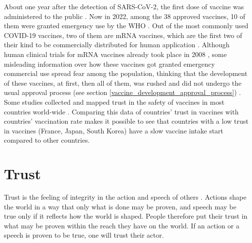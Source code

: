 About one year after the detection of SARS-CoV-2, the first dose of vaccine was administered to the public \cite{nhs_first_vaccination}. Now in 2022, among the 38 approved vaccines, 10 of them were granted emergency use by the WHO \cite{who_covid-19_vaccines_approved_2022, who_covid-19_vaccines_2022}. Out of the most commonly used COVID-19 vaccines, two of them are mRNA vaccines, which are the first two of their kind to be commercially distributed for human application \cite{uk-dhsc_pfizer_vaccine_2020, dolgin_tangled_2021}. Although human clinical trials for mRNA vaccines already took place in 2008 \cite{weide_results_2008, sahin_mrna-based_2014}, some misleading information over how these vaccines got granted emergency commercial use spread fear among the population, thinking that the development of these vaccines, at first, then all of them, was rushed and did not undergo the usual approval process (see section \ref{vaccine_development_approval_process}) \cite{uuhc_covid-19_vaccines_2022, care_is_2021}.
Some studies collected and mapped trust in the safety of vaccines in most countries world-wide \cite{figueiredo_mapping_2020, sallam_global_2022}. Comparing this data of countries' trust in vaccines with countries' vaccination rate \cite{mathieu_global_2021, ritchie_coronavirus_2020} makes it possible to see that countries with a low trust in vaccines (France, Japan, South Korea) have a slow vaccine intake start compared to other countries.



\section{Trust}
\label{trust}

Trust is the feeling of integrity in the action and speech of others \footnotemark[1]{}\footnotemark[2]{}. Actions shape the world in a way that only what is done may be proven, and speech may be true only if it reflects how the world is shaped. People therefore put their trust in what may be proven within the reach they have on the world. If an action or a speech is proven to be true, one will trust their actor.


